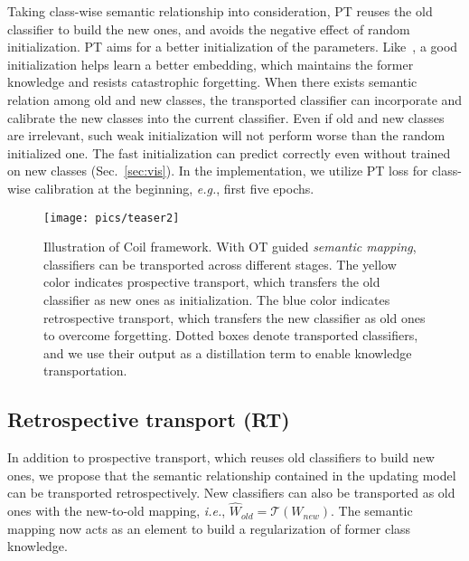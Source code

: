 \documentclass[sigconf]{acmart}
\newcommand{\T}{\mathcal{T}}
\newcommand{\eg}{\emph{e.g.}}
\newcommand{\ie}{\emph{i.e.}}
\newcommand{\name}{{\sc Coil }}
\begin{document}
 Taking class-wise semantic relationship into consideration, PT reuses the old  classifier to build the new ones, and avoids the negative effect of random initialization.
PT aims for a better initialization of the parameters. Like~\cite{arnold2021maml}, a good initialization helps learn a better embedding, which maintains the former knowledge and resists catastrophic forgetting.
When there exists semantic relation among old and new classes, the transported classifier can incorporate and calibrate the new classes into the current classifier.
{Even if old and new classes are irrelevant, such weak initialization will not perform worse than the random initialized one.} The fast initialization can predict correctly even without trained on new classes (Sec.~\ref{sec:vis}). In the implementation, we utilize PT loss for class-wise calibration at the beginning, \eg, first five epochs.


\begin{figure}[t]
	\begin{center}
		{\texttt{[image: pics/teaser2]}\label{figure:2a}}
	\end{center}
	\vspace{-3mm}
	\caption{\small Illustration of  \name framework. With OT guided \emph{semantic mapping}, classifiers can be transported across different stages. The yellow color indicates prospective transport, which transfers the old classifier as new ones as initialization. The blue color indicates retrospective transport, which transfers the new classifier as old ones to overcome forgetting. Dotted boxes denote transported classifiers, and we use their output as a distillation term to enable knowledge transportation.
	} \label{figure:method}
	\vspace{-3mm}
\end{figure} 

\subsection{Retrospective transport (RT)}
In addition to prospective transport, which reuses old classifiers to build new ones, we propose that the semantic relationship contained in the updating model can be transported  retrospectively. New classifiers can also be transported as old ones with the new-to-old mapping, \ie, $\hat{W}_{old}= \T(W_{new})$.  The semantic mapping now acts as an element to build a regularization of former class knowledge.
\end{document}
